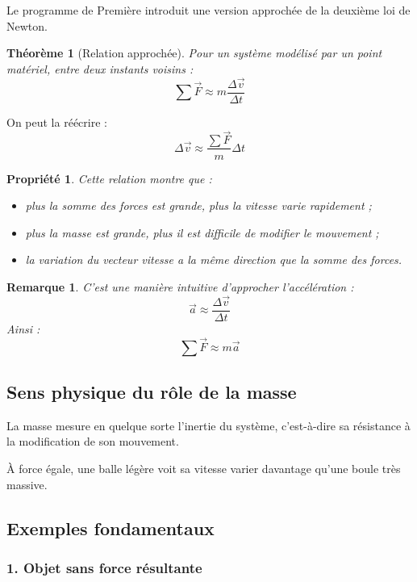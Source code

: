 \documentclass[11pt,a4paper]{article}
\newtheorem{propriete}{Propriété}[section]
\newtheorem{theoreme}{Théorème}[section]
\newtheorem{remarque}{Remarque}[section]
\begin{document}
Le programme de Première introduit une version approchée de la deuxième loi de Newton.

\begin{theoreme}[Relation approchée]
Pour un système modélisé par un point matériel, entre deux instants voisins :
\[
\sum \vec{F} \approx m\frac{\Delta \vec{v}}{\Delta t}
\]
\end{theoreme}

On peut la réécrire :
\[
\Delta \vec{v}\approx \frac{\sum \vec{F}}{m}\Delta t
\]

\begin{propriete}
Cette relation montre que :
\begin{itemize}
    \item plus la somme des forces est grande, plus la vitesse varie rapidement ;
    \item plus la masse est grande, plus il est difficile de modifier le mouvement ;
    \item la variation du vecteur vitesse a la même direction que la somme des forces.
\end{itemize}
\end{propriete}

\begin{remarque}
C'est une manière intuitive d'approcher l'accélération :
\[
\vec{a}\approx \frac{\Delta \vec{v}}{\Delta t}
\]
Ainsi :
\[
\sum \vec{F}\approx m\vec{a}
\]
\end{remarque}

\subsection{Sens physique du rôle de la masse}

La masse mesure en quelque sorte l'inertie du système, c'est-à-dire sa résistance à la modification de son mouvement.

\begin{applicationbox}
À force égale, une balle légère voit sa vitesse varier davantage qu'une boule très massive.
\end{applicationbox}

\subsection{Exemples fondamentaux}

\subsubsection*{1. Objet sans force résultante}
\end{document}
